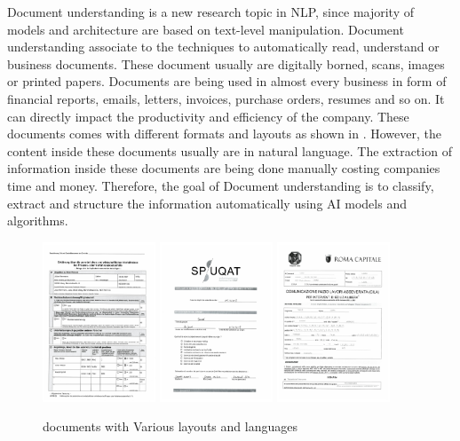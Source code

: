 Document understanding is a new research topic in NLP, since majority of models and architecture are based on text-level manipulation. Document understanding associate to the techniques to automatically read, understand or business documents. These document usually are digitally borned, scans, images or printed papers. Documents are being used in almost every business in form of financial reports, emails, letters, invoices, purchase orders, resumes and so on. It can directly impact the productivity and efficiency of the company. These documents comes with different formats and layouts as shown in . However, the content inside these documents usually are in natural language. The extraction of information inside these documents are being done manually costing companies time and money. Therefore, the goal of Document understanding is to classify, extract and structure the information automatically using AI models and algorithms. 


\begin{figure}[ht]
\includegraphics[width=0.3\textwidth]{chapters/images/de_train_0.jpg}\hfill
\includegraphics[width=0.3\textwidth]{chapters/images/Literature_review/Different_documents/fr_train_51.jpg}\hfill
\includegraphics[width=0.3\textwidth]{chapters/images/Literature_review/Different_documents/it_train_24.jpg}

\caption{documents with Various layouts and languages \cite{xfund}}
    \label{fig:different_documents}
\end{figure}


